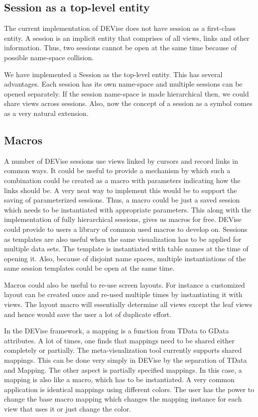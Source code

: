 \subsection{Session as a top-level entity}

The current implementation of DEVise does not have session as a first-class
entity. A session is an implicit entity that comprises of all views, links
and other information. Thus, two sessions cannot be open at the same time
because of possible name-space collision. 

We have implemented a Session as the top-level entity. This has several
advantages. Each session has its own name-space and multiple sessions can be
opened separately. If the session name-space is made hierarchical then, we
could share views across sessions. Also, now the concept of a session as a 
symbol comes as a very natural extension. 

\subsection{Macros}

A number of DEVise sessions use views linked by cursors and record links
in common ways. It could be useful to provide a mechanism by which 
such a combination could be created as a macro with parameters indicating
how the links should be. A very neat way to implement this would be to
support the saving of parameterized sessions. Thus, a macro could be 
just a saved session which needs to be instantiated with appropriate
parameters. This along with the implementation of fully hierarchical
sessions, gives us macros for free. DEVise could provide to users a library
of common used macros to develop on. Sessions as templates are also useful
when the same visualization has to be applied for multiple data sets.
The template is instantiated with table names at the time of opening it.
Also, because of disjoint name spaces, multiple instantiations of the same
session templates could be open at the same time.   

Macros could also be useful to re-use screen layouts. For
instance a customized layout can be created once and re-used multiple
times by instantiating it with views. The layout macro will essentially
determine all views except the leaf views and hence would save the
user a lot of duplicate effort.

In the DEVise framework, a mapping is a function from TData to GData 
attributes. A lot of times, one finds that mappings need to be shared
either completely or partially. The meta-visualization tool currently
supports shared mappings. This can be done very simply in DEVise by
the separation of TData and Mapping. The other aspect is partially
specified mappings. In this case, a mapping is also like a macro, which
has to be instantiated. A very common application is identical mappings
using different colors. The user has the power to change the base
macro mapping which changes the  mapping instance for each view that uses
it or just change the color. 

